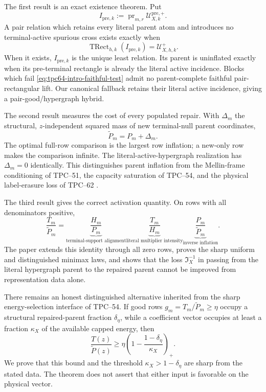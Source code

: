 The first result is an exact existence theorem.  Put
\[
 I_{\mathrm{pre},k}
 :=\operatorname{pr}_{m,r}
   \mathcal U_{X,k}^{\mathrm{pre},+}.
\]
A pair relation which retains every literal parent atom and introduces no
terminal-active spurious cross exists exactly when
\begin{equation}
 \operatorname{TRect}_{h,k}(I_{\mathrm{pre},k})
 =\mathcal U_{X,h,k}^{+}.
 \label{eq:tpc64-intro-faithful-test}
\end{equation}
When it exists, \(I_{\mathrm{pre},k}\) is the unique least relation.  Its
parent is uninflated exactly when its pre-terminal rectangle is already the
literal active incidence.  Blocks which fail
\eqref{eq:tpc64-intro-faithful-test} admit no parent-complete faithful
pair-rectangular lift.  Our canonical fallback retains their literal active
incidence, giving a pair-good/hypergraph hybrid.

The second result measures the cost of every populated repair.  With
\(\Delta_m\) the structural, \(z\)-independent squared mass of new
terminal-null parent coordinates,
\begin{equation}
 \widetilde P_m=P_m+\Delta_m.
 \label{eq:tpc64-intro-inflated-parent}
\end{equation}
The optimal full-row comparison is the largest row inflation; a new-only row
makes the comparison infinite.  The literal-active-hypergraph realization has
\(\Delta_m=0\) identically.  This distinguishes parent inflation from the
Mellin-frame conditioning of TPC--51, the capacity saturation of TPC--54,
and the physical label-erasure loss of TPC--62
\citep{WangTPC51,WangTPC54,WangTPC62}.

The third result gives the correct activation quantity.  On rows with all
denominators positive,
\begin{equation}
 \frac{T_m}{\widetilde P_m}
 =\underbrace{\frac{H_m}{P_m}}_{\text{terminal-support alignment}}
  \underbrace{\frac{T_m}{H_m}}_{\text{literal multiplier intensity}}
  \underbrace{\frac{P_m}{\widetilde P_m}}_{\text{inverse inflation}}.
 \label{eq:tpc64-intro-three-factor}
\end{equation}
The paper extends this identity through all zero rows, proves the sharp
uniform and distinguished minimax laws, and shows that the loss
\(\mathfrak I_X^{-1}\) in passing from the literal hypergraph parent to the
repaired parent cannot be improved from representation data alone.

There remains an honest distinguished alternative inherited from the sharp
energy-selection interface of TPC--54.  If good rows
\(g_m=T_m/\widetilde P_m\ge\eta\) occupy a structural repaired-parent
fraction \(\delta_\eta\), while a coefficient vector occupies at least a
fraction \(\kappa_X\) of the available capped energy, then
\begin{equation}
 \frac{T(z)}{\widetilde P(z)}
 \ge
 \eta\left(1-\frac{1-\delta_\eta}{\kappa_X}\right)_+.
 \label{eq:tpc64-intro-capacity}
\end{equation}
We prove that this bound and the threshold
\(\kappa_X>1-\delta_\eta\) are sharp from the stated data.  The theorem
does not assert that either input is favorable on the physical vector.

